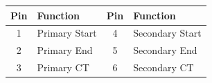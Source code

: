 \documentclass[10pt,a4paper]{article}
\begin{document}
\begin{minipage}[t]{0.48\textwidth}
\vspace{5mm}

\noindent{\large\bfseries\textcolor{headerblue}{Pin Assignment}}
\vspace{2mm}

\footnotesize
\begin{tabular}{|c|l||c|l|}
\hline
\rowcolor{lightgray}
\textbf{Pin} & \textbf{Function} & \textbf{Pin} & \textbf{Function} \\
\hline
1 & Primary Start & 4 & Secondary Start \\
\hline
2 & Primary End & 5 & Secondary End \\
\hline
3 & Primary CT & 6 & Secondary CT \\
\hline
\end{tabular}

\end{minipage}

\vspace{10mm}

\noindent{\large\bfseries\textcolor{headerblue}{Schematic Diagram}}
\vspace{3mm}

\begin{center}
\begin{minipage}{0.4\textwidth}
\centering
\end{minipage}
\hspace{10mm}
\begin{minipage}{0.4\textwidth}
\centering
\end{minipage}
\end{center}

\vspace{8mm}

\noindent{\large\bfseries\textcolor{headerblue}{Application Notes}}
\vspace{2mm}
\end{document}
